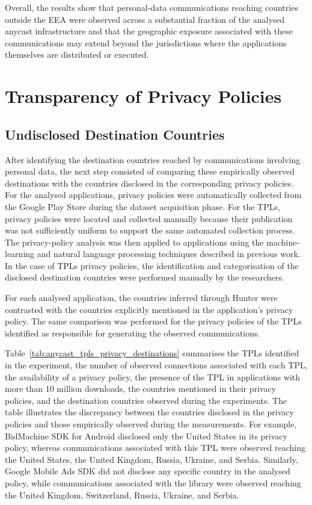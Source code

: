 Overall, the results show that personal-data communications reaching countries outside the EEA were observed across a substantial fraction of the analysed anycast infrastructure and that the geographic exposure associated with these communications may extend beyond the jurisdictions where the applications themselves are distributed or executed.

\section{Transparency of Privacy Policies}
\label{sc:anycast_experiments_transparency}

\subsection{Undisclosed Destination Countries}
\label{sc:anycast_experiments_undisclosed}

After identifying the destination countries reached by communications involving personal data, the next step consisted of comparing these empirically observed destinations with the countries disclosed in the corresponding privacy policies. For the analysed applications, privacy policies were automatically collected from the Google Play Store during the dataset acquisition phase. For the TPLs, privacy policies were located and collected manually because their publication was not sufficiently uniform to support the same automated collection process. The privacy-policy analysis was then applied to applications using the machine-learning and natural language processing techniques described in previous work. In the case of TPLs privacy policies, the identification and categorisation of the disclosed destination countries were performed manually by the researchers.

For each analysed application, the countries inferred through Hunter were contrasted with the countries explicitly mentioned in the application's privacy policy. The same comparison was performed for the privacy policies of the TPLs identified as responsible for generating the observed communications.

Table~\ref{tab:anycast_tpls_privacy_destinations} summarises the TPLs identified in the experiment, the number of observed connections associated with each TPL, the availability of a privacy policy, the presence of the TPL in applications with more than 10 million downloads, the countries mentioned in their privacy policies, and the destination countries observed during the experiments. The table illustrates the discrepancy between the countries disclosed in the privacy policies and those empirically observed during the measurements. For example, BidMachine SDK for Android disclosed only the United States in its privacy policy, whereas communications associated with this TPL were observed reaching the United States, the United Kingdom, Russia, Ukraine, and Serbia. Similarly, Google Mobile Ads SDK did not disclose any specific country in the analysed policy, while communications associated with the library were observed reaching the United Kingdom, Switzerland, Russia, Ukraine, and Serbia.

